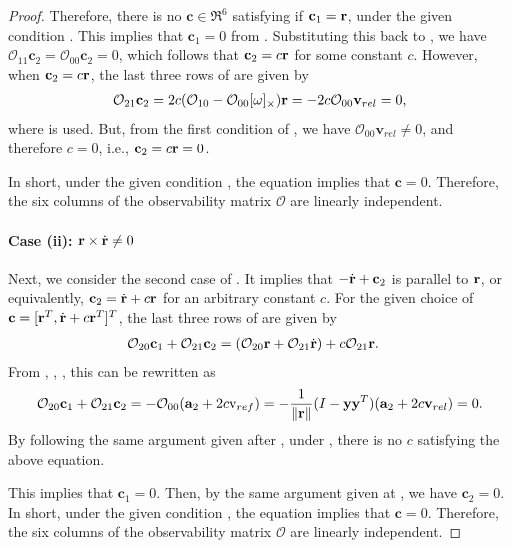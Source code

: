 \begin{proof}
Therefore, there is no $\mathbf{c}\in\Re^6$ satisfying  if $\mathbf{c}_1=\mathbf{r}$, under the given condition . This implies that $\mathbf{c}_1=0$ from . Substituting this back to , we have $\mathcal{O}_{11}\mathbf{c}_2=\mathcal{O}_{00}\mathbf{c}_2=0$, which follows that $\mathbf{c}_2=c\mathbf{r}$ for some constant $c$. However, when $\mathbf{c}_2=c\mathbf{r}$, the last three rows of  are given by
\begin{align}
\mathcal{O}_{21}\mathbf{c}_2 = 2c(\mathcal{O}_{10}-\mathcal{O}_{00}[\omega]_\times) \mathbf{r}
= -2c\mathcal{O}_{00}\mathbf{v}_{rel}=0,\label{eqn:row3i1}
\end{align}
where  is used. But, from the first condition of , we have $\mathcal{O}_{00}\mathbf{v}_{rel}\neq 0$, and therefore $c=0$, i.e., $\mathbf{c}_2=c\mathbf{r} =0$.

In short, under the given condition , the equation  implies that $\mathbf{c}=0$. Therefore, the six columns of the observability matrix $\mathcal{O}$ are linearly independent. 

\paragraph{Case (ii): $\mathbf{r}\times\dot {\mathbf{r}}\neq0$} Next, we consider the second case of . It implies that $-\dot{\mathbf{r}} + \mathbf{c}_2$ is parallel to $\mathbf{r}$, or equivalently, $\mathbf{c}_2 = \dot{\mathbf{r}} + c\mathbf{r}$ for an arbitrary constant $c$. For the given choice of $\mathbf{c}=[\mathbf{r}^T,\dot{\mathbf{r}}+ c\mathbf{r}^T]^T$, the last three rows of  are given by
\begin{align*}
\mathcal{O}_{20} \mathbf{c}_1 +\mathcal{O}_{21} \mathbf{c}_2 
& = (\mathcal{O}_{20} \mathbf{r}+\mathcal{O}_{21}\dot{\mathbf{r}}) + c\mathcal{O}_{21} \mathbf{r}.
\end{align*}
From , , , this can be rewritten as
\begin{align*}
\mathcal{O}_{20} \mathbf{c}_1 +\mathcal{O}_{21} \mathbf{c}_2 
= -\mathcal{O}_{00}(\mathbf{a}_2+2c\mathrm{v}_{ref})= -\frac{1}{\|\mathbf{r}\|}(I-\mathbf{y}\mathbf{y}^T)(\mathbf{a}_2+2c\mathbf{v}_{rel})=0.
\end{align*}
By following the same argument given after , under , there is no $c$ satisfying the above equation. 

This implies that $\mathbf{c}_1=0$. Then, by the same argument given at , we have $\mathbf{c}_2=0$. In short, under the given condition , the equation  implies that $\mathbf{c}=0$. Therefore, the six columns of the observability matrix $\mathcal{O}$ are linearly independent. 
\end{proof}

